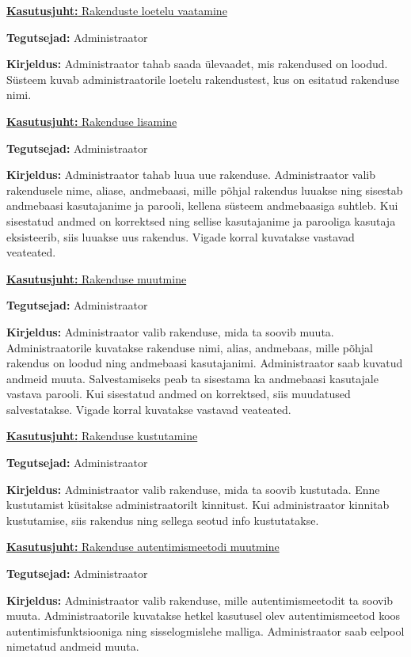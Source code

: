 \documentclass[a4paper,12pt]{article} %
\begin{document}
\underline{\textbf{Kasutusjuht:} Rakenduste loetelu vaatamine}
\par
\textbf{Tegutsejad:} Administraator
\par
\textbf{Kirjeldus:} Administraator tahab saada ülevaadet, mis rakendused on loodud. Süsteem kuvab administraatorile loetelu rakendustest, kus on esitatud rakenduse nimi.
\par

\underline{\textbf{Kasutusjuht:} Rakenduse lisamine}
\par
\textbf{Tegutsejad:} Administraator
\par
\textbf{Kirjeldus:} Administraator tahab luua uue rakenduse. Administraator valib rakendusele nime, aliase, andmebaasi, mille põhjal rakendus luuakse ning sisestab andmebaasi kasutajanime ja parooli, kellena süsteem andmebaasiga suhtleb. Kui sisestatud andmed on korrektsed ning sellise kasutajanime ja parooliga kasutaja eksisteerib, siis luuakse uus rakendus. Vigade korral kuvatakse vastavad veateated.
\par

\underline{\textbf{Kasutusjuht:} Rakenduse muutmine}
\par
\textbf{Tegutsejad:} Administraator
\par
\textbf{Kirjeldus:} Administraator valib rakenduse, mida ta soovib muuta. Administraatorile kuvatakse rakenduse nimi, alias, andmebaas, mille põhjal rakendus on loodud ning andmebaasi kasutajanimi. Administraator saab kuvatud andmeid muuta. Salvestamiseks peab ta sisestama ka andmebaasi kasutajale vastava parooli. Kui sisestatud andmed on korrektsed, siis muudatused salvestatakse. Vigade korral kuvatakse vastavad veateated.
\par

\underline{\textbf{Kasutusjuht:} Rakenduse kustutamine}
\par
\textbf{Tegutsejad:} Administraator
\par
\textbf{Kirjeldus:} Administraator valib rakenduse, mida ta soovib kustutada. Enne kustutamist küsitakse administraatorilt kinnitust. Kui administraator kinnitab kustutamise, siis rakendus ning sellega seotud info kustutatakse.
\par

\underline{\textbf{Kasutusjuht:} Rakenduse autentimismeetodi muutmine}
\par
\textbf{Tegutsejad:} Administraator
\par
\textbf{Kirjeldus:} Administraator valib rakenduse, mille autentimismeetodit ta soovib muuta. Administraatorile kuvatakse hetkel kasutusel olev autentimismeetod koos autentimisfunktsiooniga ning sisselogmislehe malliga. Administraator saab eelpool nimetatud andmeid muuta.
\par
\end{document}

